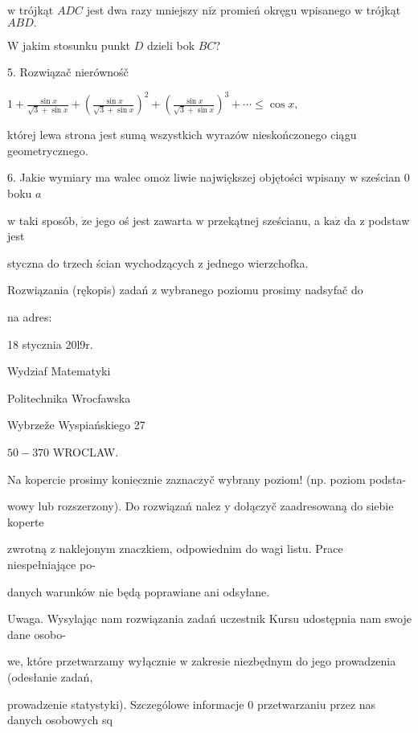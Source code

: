 \documentclass[a4paper,12pt]{article}
\begin{document}
$\mathrm{w}$ trójkąt $ADC$ jest dwa razy mniejszy $\mathrm{n}\mathrm{i}\dot{\mathrm{z}}$ promień okręgu wpisanego $\mathrm{w}$ trójkąt $ABD.$

$\mathrm{W}$ jakim stosunku punkt $D$ dzieli bok $BC$?

5. Rozwiązač nierównośč

$1+\displaystyle \frac{\sin x}{\sqrt{3}+\sin x}+(\frac{\sin x}{\sqrt{3}+\sin x})^{2}+(\frac{\sin x}{\sqrt{3}+\sin x})^{3}+\cdots\leq\cos x,$

której lewa strona jest sumą wszystkich wyrazów nieskończonego ciągu geometrycznego.

6. Jakie wymiary ma walec $\mathrm{o}\mathrm{m}\mathrm{o}\dot{\mathrm{z}}$ liwie największej objętości wpisany $\mathrm{w}$ sześcian $0$ boku $a$

$\mathrm{w}$ taki sposób, $\dot{\mathrm{z}}\mathrm{e}$ jego oś jest zawarta $\mathrm{w}$ przekątnej sześcianu, a $\mathrm{k}\mathrm{a}\dot{\mathrm{z}}$ da $\mathrm{z}$ podstaw jest

styczna do trzech ścian wychodzących $\mathrm{z}$ jednego wierzchofka.

Rozwiązania (rękopis) zadań z wybranego poziomu prosimy nadsyfač do

na adres:

18 stycznia 20l9r.

Wydziaf Matematyki

Politechnika Wrocfawska

Wybrzeže Wyspiańskiego 27

$50-370$ WROCLAW.

Na kopercie prosimy $\underline{\mathrm{k}\mathrm{o}\mathrm{n}\mathrm{i}\mathrm{e}\mathrm{c}\mathrm{z}\mathrm{n}\mathrm{i}\mathrm{e}}$ zaznaczyč wybrany poziom! (np. poziom podsta-

wowy lub rozszerzony). Do rozwiązań nalez $\mathrm{y}$ dołączyč zaadresowaną do siebie koperte

zwrotną $\mathrm{z}$ naklejonym znaczkiem, odpowiednim do wagi listu. Prace niespełniające po-

danych warunków nie będą poprawiane ani odsyłane.

Uwaga. Wysylając nam rozwiązania zadań uczestnik Kursu udostępnia nam swoje dane osobo-

we, które przetwarzamy wyłącznie $\mathrm{w}$ zakresie niezbędnym do jego prowadzenia (odesłanie zadań,

prowadzenie statystyki). Szczególowe informacje $0$ przetwarzaniu przez nas danych osobowych sq
\end{document}
